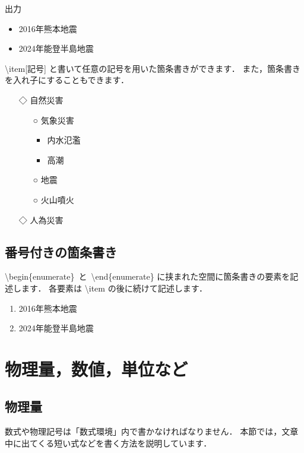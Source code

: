 \documentclass[11pt,a4j,onecolumn]{jsreport} %
\begin{document}
出力

\begin{itemize}
  \item 2016年熊本地震
  \item 2024年能登半島地震
\end{itemize}

\textbackslash item[記号] と書いて任意の記号を用いた箇条書きができます．
また，箇条書きを入れ子にすることもできます．

\begin{itemize}
  \item[◇] 自然災害
  \begin{itemize}
    \item[○] 気象災害
    \begin{itemize}
      \item 内水氾濫
      \item 高潮
    \end{itemize}
    \item[○] 地震
    \item[○] 火山噴火
  \end{itemize}
  \item[◇] 人為災害
\end{itemize}

\subsection{番号付きの箇条書き}

\textbackslash begin\{enumerate\}~と~\textbackslash end\{enumerate\} に挟まれた空間に箇条書きの要素を記述します．
各要素は \textbackslash item の後に続けて記述します．

\begin{enumerate}
  \item 2016年熊本地震
  \item 2024年能登半島地震
\end{enumerate}


\section{物理量，数値，単位など}

\subsection{物理量}

数式や物理記号は「数式環境」内で書かなければなりません．
本節では，文章中に出てくる短い式などを書く方法を説明しています．
\end{document}
